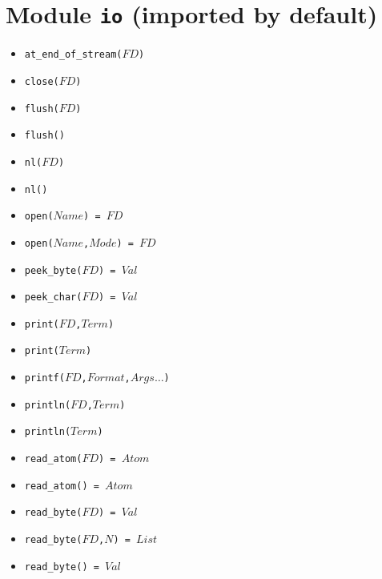 \documentclass[10pt]{article}
\begin{document}
\begin{multicols}{2}
\begin{scriptsize}
\begin{itemize}
\end{itemize}
\end{scriptsize}
\section*{Module \texttt{io} (imported by default)}
\begin{scriptsize}
\begin{itemize}
   \item \texttt{at\_end\_of\_stream($FD$)}
   \item \texttt{close($FD$)}
   \item \texttt{flush($FD$)}
   \item \texttt{flush()}
   \item \texttt{nl($FD$)}
   \item \texttt{nl()}
   \item \texttt{open($Name$) = $FD$}
   \item \texttt{open($Name$,$Mode$) = $FD$}
   \item \texttt{peek\_byte($FD$) = $Val$}
   \item \texttt{peek\_char($FD$) = $Val$}
   \item \texttt{print($FD$,$Term$)}
   \item \texttt{print($Term$)}
   \item \texttt{printf($FD$,$Format$,$Args\ldots$)}
   \item \texttt{println($FD$,$Term$)}
   \item \texttt{println($Term$)}
   \item \texttt{read\_atom($FD$) = $Atom$}
   \item \texttt{read\_atom() = $Atom$}
   \item \texttt{read\_byte($FD$) = $Val$}
   \item \texttt{read\_byte($FD$,$N$) = $List$}
   \item \texttt{read\_byte() = $Val$}

\end{itemize}
\end{scriptsize}
\end{multicols}
\end{document}
